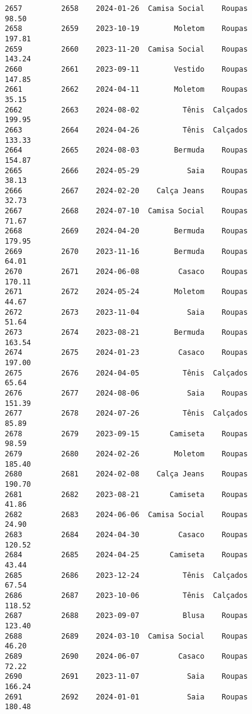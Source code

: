 \documentclass[11pt]{article}
\begin{document}
\begin{Verbatim}[commandchars=\\\{\}]
2657         2658    2024-01-26  Camisa Social    Roupas           98.50   
2658         2659    2023-10-19        Moletom    Roupas          197.81   
2659         2660    2023-11-20  Camisa Social    Roupas          143.24   
2660         2661    2023-09-11        Vestido    Roupas          147.85   
2661         2662    2024-04-11        Moletom    Roupas           35.15   
2662         2663    2024-08-02          Tênis  Calçados          199.95   
2663         2664    2024-04-26          Tênis  Calçados          133.33   
2664         2665    2024-08-03        Bermuda    Roupas          154.87   
2665         2666    2024-05-29           Saia    Roupas           38.13   
2666         2667    2024-02-20    Calça Jeans    Roupas           32.73   
2667         2668    2024-07-10  Camisa Social    Roupas           71.67   
2668         2669    2024-04-20        Bermuda    Roupas          179.95   
2669         2670    2023-11-16        Bermuda    Roupas           64.01   
2670         2671    2024-06-08         Casaco    Roupas          170.11   
2671         2672    2024-05-24        Moletom    Roupas           44.67   
2672         2673    2023-11-04           Saia    Roupas           51.64   
2673         2674    2023-08-21        Bermuda    Roupas          163.54   
2674         2675    2024-01-23         Casaco    Roupas          197.00   
2675         2676    2024-04-05          Tênis  Calçados           65.64   
2676         2677    2024-08-06           Saia    Roupas          151.39   
2677         2678    2024-07-26          Tênis  Calçados           85.89   
2678         2679    2023-09-15       Camiseta    Roupas           98.59   
2679         2680    2024-02-26        Moletom    Roupas          185.40   
2680         2681    2024-02-08    Calça Jeans    Roupas          190.70   
2681         2682    2023-08-21       Camiseta    Roupas           41.86   
2682         2683    2024-06-06  Camisa Social    Roupas           24.90   
2683         2684    2024-04-30         Casaco    Roupas          120.52   
2684         2685    2024-04-25       Camiseta    Roupas           43.44   
2685         2686    2023-12-24          Tênis  Calçados           67.54   
2686         2687    2023-10-06          Tênis  Calçados          118.52   
2687         2688    2023-09-07          Blusa    Roupas          123.40   
2688         2689    2024-03-10  Camisa Social    Roupas           46.20   
2689         2690    2024-06-07         Casaco    Roupas           72.22   
2690         2691    2023-11-07           Saia    Roupas          166.24   
2691         2692    2024-01-01           Saia    Roupas          180.48   

\end{Verbatim}
\end{document}

